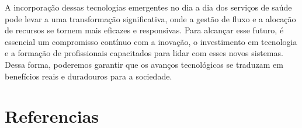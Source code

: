 \documentclass[conference, a4paper, 12pt]{IEEEtran}
\begin{document}
  A incorporação dessas tecnologias emergentes no dia a dia dos serviços de saúde pode levar a uma transformação significativa, onde a gestão de fluxo e a alocação de recursos se tornem mais eficazes e responsivas. Para alcançar esse futuro, é essencial um compromisso contínuo com a inovação, o investimento em tecnologia e a formação de profissionais capacitados para lidar com esses novos sistemas. Dessa forma, poderemos garantir que os avanços tecnológicos se traduzam em benefícios reais e duradouros para a sociedade. 






\section{Referencias}
\label{sec:references}



\end{document}
